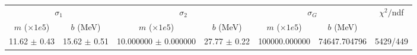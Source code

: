 \begin{tabular}{cc|cc|cc||c}
\multicolumn{2}{c|}{$\sigma_1$} & \multicolumn{2}{|c}{$\sigma_2$} & \multicolumn{2}{|c}{$\sigma_G$}  & \multirow{2}{*}{$\chi^2/$ndf}\\
$m$ ($\times1e5$) & $b$ (MeV) & $m$ ($\times1e5$) & $b$ (MeV) & $m$ ($\times1e5$) & $b$ (MeV) & \\
\hline
11.62 $\pm$ 0.43 & 15.62 $\pm$ 0.51 & 10.000000 $\pm$ 0.000000 & 27.77 $\pm$ 0.22 & 100000.000000 & 74647.704796 & 5429/449\\
\end{tabular}
